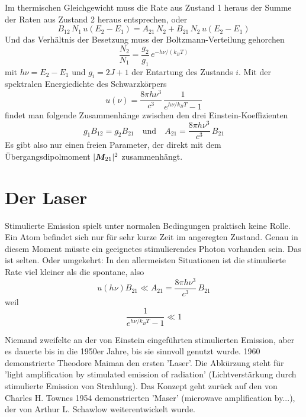 Im thermischen Gleichgewicht muss die Rate aus Zustand 1 heraus  der Summe der Raten aus Zustand 2 heraus entsprechen, 
oder 
\begin{equation}
    B_{12} \, N_1 \, u(E_2 - E_1) =   A_{21} \, N_2 + B_{21} \, N_2 \, u(E_2 - E_1) 
\end{equation}
Und das Verhältnis der Besetzung muss der Boltzmann-Verteilung gehorchen
\begin{equation}
    \frac{N_2}{N_1} = \frac{g_2}{g_1} \, e^{- h \nu / (k_B T)}
\end{equation}
mit $h \nu = E_2 - E_1$ und $g_i = 2J +1$ der Entartung des Zustands $i$. Mit der spektralen Energiedichte des Schwarzkörpers 
\begin{equation}
    u(\nu) = \frac{8 \pi h \nu^3}{c^3} \,  \frac{1}{e^{h\nu/k_B T} -1}
\end{equation}
findet man folgende Zusammenhänge zwischen den drei Einstein-Koeffizienten
\begin{equation}
   g_1 B_{12}  = g_2 B_{21} \quad \text{und} \quad
   A_{21} = \frac{8 \pi h \nu^3}{c^3}\, B_{21} 
\end{equation}
Es gibt also nur einen freien Parameter, der direkt mit dem Übergangsdipolmoment $|\boldsymbol{M}_{21}|^2$ zusammenhängt.


\section{Der Laser}

Stimulierte Emission spielt unter normalen Bedingungen praktisch keine Rolle. Ein Atom befindet sich nur für sehr kurze Zeit im angeregten Zustand. Genau in diesem Moment müsste ein geeignetes stimulierendes Photon vorhanden sein. Das ist selten. Oder umgekehrt: In den allermeisten Situationen ist die stimulierte Rate viel kleiner als die spontane, also 
\begin{equation}
    u(h\nu)  B_{21}  \ll A_{21} = \frac{8 \pi h \nu^3}{c^3} \, B_{21} 
\end{equation}
weil 
\begin{equation} 
    \frac{1}{e^{h\nu/k_B T} -1} \ll 1
\end{equation}

Niemand zweifelte an der von Einstein eingeführten stimulierten Emission, aber es dauerte bis in die 1950er Jahre, bis sie sinnvoll genutzt wurde. 1960 demonstrierte Theodore Maiman den ersten 'Laser'. Die Abkürzung steht für 'light amplification by stimulated emission of radiation' (Lichtverstärkung durch stimulierte Emission von Strahlung). Das Konzept geht zurück auf den von Charles H. Townes 1954 demonstrierten 'Maser' (microwave amplification by...), der von Arthur L. Schawlow weiterentwickelt wurde.


